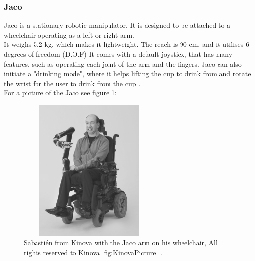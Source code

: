 \subsubsection*{Jaco}
Jaco is a stationary robotic manipulator. It is designed to be attached to a wheelchair operating as a left or right arm.\\
It weighs 5.2 kg, which makes it lightweight. The reach is 90 cm, and it utilises 6 degrees of freedom (D.O.F) It comes with a default joystick, that has many features, such as operating each joint of the arm and the fingers. Jaco can also initiate a "drinking mode", where it helps lifting the cup to drink from and rotate the wrist for the user to drink from the cup \cite{JACO}.\\
For a picture of the Jaco see figure \ref{fig:Sebastién}:
\begin{figure}[H]
    \centering
    \includegraphics[width=7cm,height=7cm]{Figures/Technical_figures/Sebastien.jpg}
    \caption{Sabastién from Kinova with the Jaco arm on his wheelchair, All rights reserved to Kinova \ref{fig:KinovaPicture} \cite{Kinova}.}
    \label{fig:Sebastién}
\end{figure}
